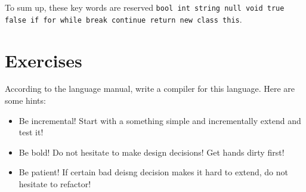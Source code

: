 \documentclass{article}
\begin{document}
To sum up, these key words are reserved \texttt{bool int string null void true false if for while break continue return new class this}.

\section{Exercises}

According to the language manual, write a compiler for this language. Here are some hints:

\begin{itemize}
  \item Be incremental! Start with a something simple and incrementally extend and test it!
  \item Be bold! Do not hesitate to make design decisions! Get hands dirty first!
  \item Be patient! If certain bad deisng decision makes it hard to extend, do not hesitate to refactor!
\end{itemize}
\end{document}
